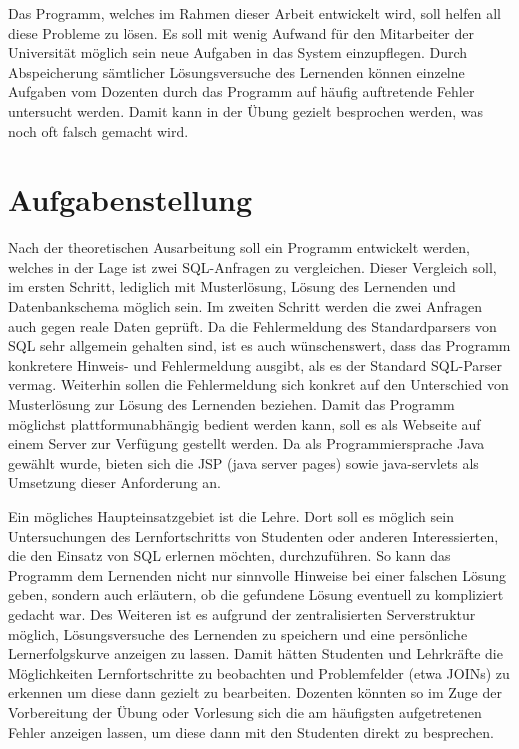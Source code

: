 Das Programm, welches im Rahmen dieser Arbeit entwickelt wird, soll helfen all diese Probleme zu lösen. Es soll mit wenig Aufwand für den Mitarbeiter der Universität möglich sein neue Aufgaben in das System einzupflegen. Durch Abspeicherung sämtlicher Lösungsversuche des Lernenden können einzelne Aufgaben vom Dozenten durch das Programm auf häufig auftretende Fehler untersucht werden. Damit kann in der Übung gezielt besprochen werden, was noch oft falsch gemacht wird.

\section{Aufgabenstellung}

Nach der theoretischen Ausarbeitung soll ein Programm entwickelt werden, welches in der Lage ist zwei SQL-Anfragen zu vergleichen. Dieser Vergleich soll, im ersten Schritt, lediglich mit Musterlösung, Lösung des Lernenden und Datenbankschema möglich sein. Im zweiten Schritt werden die zwei Anfragen auch gegen reale Daten geprüft. Da die Fehlermeldung des Standardparsers von SQL sehr allgemein gehalten sind, ist es auch wünschenswert, dass das Programm konkretere Hinweis- und Fehlermeldung ausgibt, als es der Standard SQL-Parser vermag. Weiterhin sollen die Fehlermeldung sich konkret auf den Unterschied von Musterlösung zur Lösung des Lernenden beziehen. Damit das Programm möglichst plattformunabhängig bedient werden kann, soll es als Webseite auf einem Server zur Verfügung gestellt werden. Da als Programmiersprache Java gewählt wurde, bieten sich die JSP (java server pages) sowie java-servlets als Umsetzung dieser Anforderung an.

Ein mögliches Haupteinsatzgebiet ist die Lehre. Dort soll es möglich sein Untersuchungen des Lernfortschritts von Studenten oder anderen Interessierten, die den Einsatz von SQL erlernen möchten, durchzuführen. So kann das Programm dem Lernenden nicht nur sinnvolle Hinweise bei einer falschen Lösung geben, sondern auch erläutern, ob die gefundene Lösung eventuell zu kompliziert gedacht war. Des Weiteren ist es aufgrund der zentralisierten Serverstruktur möglich, Lösungsversuche des Lernenden zu speichern und eine persönliche Lernerfolgskurve anzeigen zu lassen. Damit hätten Studenten und Lehrkräfte die Möglichkeiten Lernfortschritte zu beobachten und Problemfelder (etwa JOINs) zu erkennen um diese dann gezielt zu bearbeiten. Dozenten könnten so im Zuge der Vorbereitung der Übung oder Vorlesung sich die am häufigsten aufgetretenen Fehler anzeigen lassen, um diese dann mit den Studenten direkt zu besprechen.

